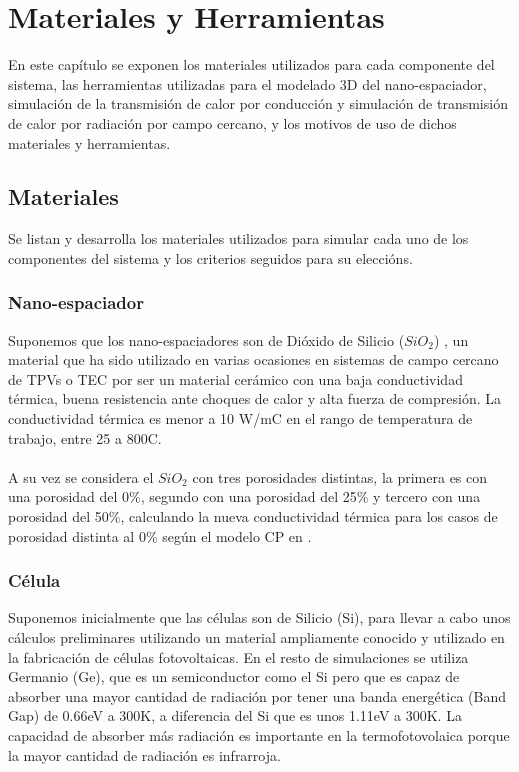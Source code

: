 \chapter{Materiales y Herramientas}
En este capítulo se exponen los materiales utilizados para cada componente del sistema, las herramientas utilizadas para el modelado 3D del nano-espaciador, simulación de la transmisión de calor por conducción y simulación de transmisión de calor por radiación por campo cercano, y los motivos de uso de dichos materiales y herramientas.
\section{Materiales}
Se listan y desarrolla los materiales utilizados para simular cada uno de los componentes del sistema y los criterios seguidos para su eleccións.
\subsection{Nano-espaciador}
Suponemos que los nano-espaciadores son de Dióxido de Silicio ($SiO_2$) \cite{doi:10.1063/1.1141498}, un material que ha sido utilizado en varias ocasiones en sistemas de campo cercano de TPVs o TEC por ser un material cerámico con una baja conductividad térmica, buena resistencia ante choques de calor y alta fuerza de compresión. La conductividad térmica es menor a 10 W/m\textdegree C en el rango de temperatura de trabajo, entre 25 a 800\textdegree C.\\\\
A su vez se considera el $SiO_2$ con tres porosidades distintas, la primera es con una porosidad del 0\%, segundo con una porosidad del 25\% y tercero con una porosidad del 50\%, calculando la nueva conductividad térmica para los casos de porosidad distinta al 0\% según el modelo CP en \cite{ThermalConductivity_SiO2_2018}.

\subsection{Célula}
Suponemos inicialmente que las células son de Silicio (Si), para llevar a cabo unos cálculos preliminares utilizando un material ampliamente conocido y utilizado en la fabricación de células fotovoltaicas. En el resto de simulaciones se utiliza Germanio (Ge), que es un semiconductor como el Si pero que es capaz de absorber una mayor cantidad de radiación por tener una banda energética (Band Gap) de 0.66eV a 300K, a diferencia del Si que es unos 1.11eV a 300K. La capacidad de absorber más radiación es importante en la termofotovolaica porque la mayor cantidad de radiación es infrarroja.\\

